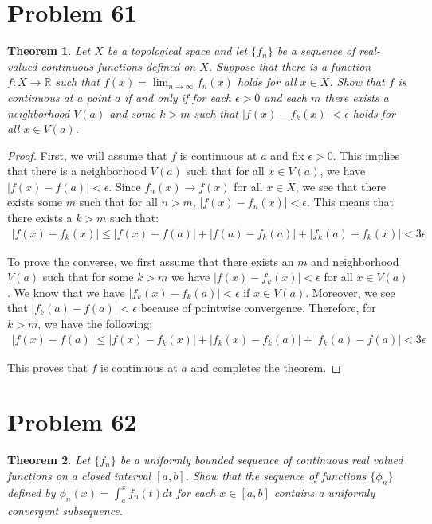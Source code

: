 \documentclass[psamsfonts]{amsart}
\newtheorem{thm}{Theorem}[section]
\theoremstyle{definition}
\theoremstyle{remark}
\numberwithin{equation}{section}
\begin{document}
\section{Problem 61}

\begin{thm}
Let $X$ be a topological space and let $\{ f_n \}$ be a sequence of real-valued continuous functions defined on $X$. Suppose that there is a function $f: X \to \mathbb{R}$ such that $f(x) = \lim_{n \to \infty} f_n(x)$ holds for all $x \in X$. Show that $f$ is continuous at a point $a$ if and only if for each $\epsilon > 0$ and each $m$ there exists a neighborhood $V(a)$ and some $k > m$ such that $|f(x) - f_k(x)| < \epsilon$ holds for all $x \in V(a)$. 
\end{thm}

\begin{proof}
First, we will assume that $f$ is continuous at $a$ and fix $\epsilon > 0$. This implies that there is a neighborhood $V(a)$ such that for all $x \in V(a)$, we have $|f(x) - f(a)| < \epsilon$. Since $f_n(x) \to f(x)$ for all $x \in X$, we see that there exists some $m$ such that for all $n > m$, $|f(x) - f_n(x)| < \epsilon$. This means that there exists a $k > m$ such that:
\begin{eqnarray}
 |f(x) - f_k(x)| \leq |f(x) - f(a)| + |f(a) - f_k(a)| + |f_k(a) - f_k(x)| < 3 \epsilon
\end{eqnarray}

To prove the converse, we first assume that there exists an $m$ and neighborhood $V(a)$ such that for some $k > m$ we have $|f(x) - f_k(x)| < \epsilon $ for all $x \in V(a)$. We know that we have $|f_k(x) - f_k(a)| < \epsilon$ if $x \in V(a)$. Moreover, we see that $|f_k(a) - f(a)| < \epsilon$ because of pointwise convergence. Therefore, for $k > m$, we have the following:
\begin{eqnarray}
|f(x) - f(a)| \leq |f(x) - f_k(x)| + |f_k(x) - f_k(a)| + |f_k(a) - f(a)| < 3 \epsilon
\end{eqnarray}

This proves that $f$ is continuous at $a$ and completes the theorem.
\end{proof}

\section{Problem 62}

\begin{thm}
Let $\{ f_n \}$ be a uniformly bounded sequence of continuous real valued functions on a closed interval $[a,b]$. Show that the sequence of functions $\{ \phi_n \}$ defined by $\phi_n(x) = \int_a^x f_n(t) dt$ for each $x \in [a,b]$ contains a uniformly convergent subsequence.
\end{thm}
\end{document}
